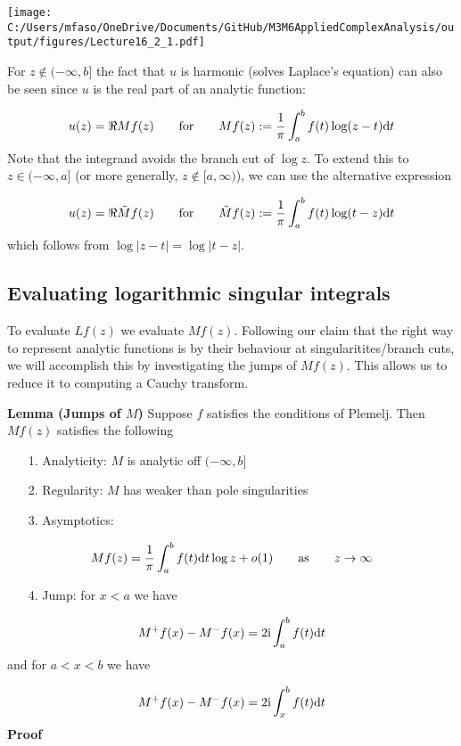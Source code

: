 \documentclass[12pt,a4paper]{article}
\def\qqfor{\qquad\hbox{for}\qquad}
\def\qqas{\qquad\hbox{as}\qquad}
\def\D{ {\rm d} }
\def\I{ {\rm i} }
\def\dt{\D t}
\begin{document}
\texttt{[image: C:/Users/mfaso/OneDrive/Documents/GitHub/M3M6AppliedComplexAnalysis/output/figures/Lecture16\_2\_1.pdf]}

For $z \notin (-\infty,b]$ the fact that $u$ is harmonic (solves Laplace's equation) can also be seen since $u$ is the real part of an analytic function:

\[
    u(z) = \Re Mf(z) \qqfor  Mf(z) := {1 \over \pi} \int_a^b f(t) \log ( z - t) \dt
\]
Note that the integrand avoids the branch cut of $\log z$. To extend this to $z\in (-\infty,a]$ (or more generally, $z \notin [a,\infty)$), we can use the alternative expression

\[
    u(z) = \Re \tilde Mf(z) \qqfor  \tilde Mf(z) := {1 \over \pi} \int_a^b f(t) \log ( t-z) \dt
\]
which follows from $\log|z-t| = \log|t-z|$.

\subsection{Evaluating logarithmic singular integrals}
To evaluate $L f(z)$ we evaluate $M f(z)$. Following our claim that the right way to represent analytic functions is by their behaviour at singularitites/branch cuts, we will accomplish this by investigating the jumps of $M f(z)$. This allows us to reduce it to computing a Cauchy transform.

\textbf{Lemma (Jumps of $M$)} Suppose $f$ satisfies the conditions of Plemelj. Then $M f(z)$ satisfies the following

\begin{itemize}
\item[1. ] Analyticity: $M$ is analytic off $(-\infty,b]$


\item[2. ] Regularity: $M$ has weaker than pole singularities


\item[3. ] Asymptotics:

\end{itemize}
\[
Mf(z) = {1 \over \pi} \int_a^b f(t) \D t \log z + o(1) \qqas z \rightarrow \infty
\]
\begin{itemize}
\item[4. ] Jump: for $x < a$ we have

\end{itemize}
\[
M^+f(x) - M^-f(x) = 2 \I \int_a^b f(t) \D t
\]
and for $a < x < b$ we have

\[
M^+ f(x) - M^-f(x) = 2 \I \int_x^b f(t) \D t
\]
\textbf{Proof}
\end{document}
